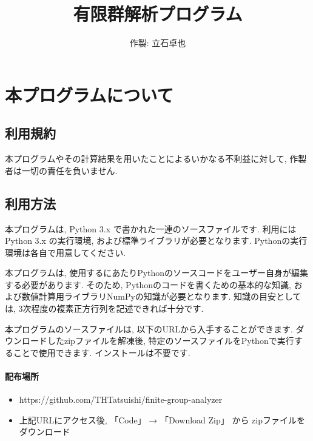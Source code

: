 \documentclass[11pt, a4paper]{jsarticle}
\title{
有限群解析プログラム
}
\author{
作製: 立石卓也
}
\begin{document}
\maketitle
\tableofcontents
\newpage
\section{本プログラムについて}

\subsection{利用規約}
本プログラムやその計算結果を用いたことによるいかなる不利益に対して, 作製者は一切の責任を負いません.

\subsection{利用方法} \label{sec:way}
本プログラムは, Python 3.x で書かれた一連のソースファイルです.
利用にはPython 3.x の実行環境, および標準ライブラリが必要となります.
Pythonの実行環境は各自で用意してください.

本プログラムは, 使用するにあたりPythonのソースコードをユーザー自身が編集する必要があります.
そのため, Pythonのコードを書くための基本的な知識, および数値計算用ライブラリNumPyの知識が必要となります.
知識の目安としては, 3次程度の複素正方行列を記述できれば十分です.

本プログラムのソースファイルは, 以下のURLから入手することができます.
ダウンロードしたzipファイルを解凍後, 特定のソースファイルをPythonで実行することで使用できます.
インストールは不要です.

\paragraph{配布場所}
\begin{itemize}
\item https://github.com/THTatsuishi/finite-group-analyzer
\item 上記URLにアクセス後, 「Code」 → 「Download Zip」 から zipファイルをダウンロード
\end{itemize}
\end{document}
